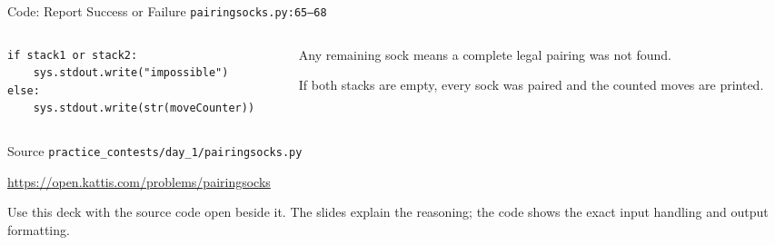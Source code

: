 \documentclass[aspectratio=169,11pt]{beamer}
\begin{document}
\begin{frame}[fragile]{Code: Report Success or Failure}
\scriptsize
{} \texttt{pairingsocks.py:65--68}

\vspace{0.08cm}
\begin{columns}[T,totalwidth=\textwidth]
\begin{column}{0.58\textwidth}
\begin{lstlisting}[style=cpcode]
if stack1 or stack2:
    sys.stdout.write("impossible")
else:
    sys.stdout.write(str(moveCounter))
\end{lstlisting}
\end{column}
\begin{column}{0.38\textwidth}
\begin{tightitemize}
  \item Any remaining sock means a complete legal pairing was not found.
  \item If both stacks are empty, every sock was paired and the counted moves are printed.
\end{tightitemize}
\end{column}
\end{columns}
\end{frame}

\begin{frame}{Source}
\small
{} \texttt{practice\_contests/day\_1/pairingsocks.py}

\vspace{0.3cm}
 \url{https://open.kattis.com/problems/pairingsocks}

\vspace{0.45cm}
Use this deck with the source code open beside it. The slides explain the reasoning; the code shows the exact input handling and output formatting.
\end{frame}
\end{document}
